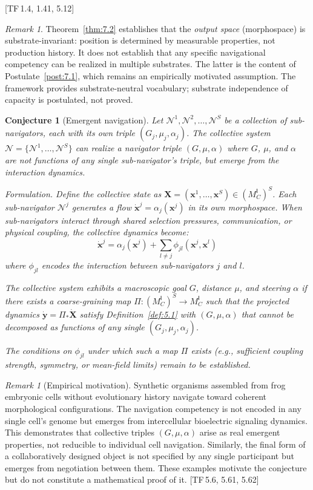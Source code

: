 \documentclass[10pt]{article}
\theoremstyle{definition}
\theoremstyle{plain}
\newtheorem{conjecture}[definition]{Conjecture}
\theoremstyle{remark}
\newtheorem{remark}[definition]{Remark}
\newcommand{\MC}{M^{\mathsf{I}}_C}          %
\newcommand{\Nav}{\mathcal{N}}               %
\newcommand{\TF}[1]{\textnormal{[TF\,#1]}}  %
\begin{document}
\TF{1.4, 1.41, 5.12}

\begin{remark}
Theorem~\ref{thm:7.2} establishes that the \emph{output space}
(morphospace) is substrate-invariant: position is determined by
measurable properties, not production history. It does not
establish that any specific navigational competency can be realized
in multiple substrates. The latter is the content of
Postulate~\ref{post:7.1}, which remains an empirically motivated
assumption. The framework provides substrate-neutral vocabulary;
substrate independence of capacity is postulated, not proved.
\end{remark}

\begin{conjecture}[Emergent navigation]\label{conj:7.3}
Let $\Nav^1, \Nav^2, \ldots, \Nav^S$ be a collection of sub-navigators,
each with its own triple $(G_j, \mu_j, \alpha_j)$. The collective system
$\Nav = \{\Nav^1, \ldots, \Nav^S\}$ can realize a navigator triple
$(G, \mu, \alpha)$ where $G$, $\mu$, and $\alpha$ are \emph{not}
functions of any single sub-navigator's triple, but emerge from the
interaction dynamics.

\medskip\noindent
\textit{Formulation.}\;
Define the collective state as $\bm{X} = (\bm{x}^1, \ldots, \bm{x}^S)
\in {(\MC)}^S$. Each sub-navigator $\Nav^j$ generates a flow
$\dot{\bm{x}}^j = \alpha_j(\bm{x}^j)$ in its own morphospace.
When sub-navigators interact through shared selection pressures,
communication, or physical coupling, the collective dynamics become:
\[
  \dot{\bm{x}}^j = \alpha_j(\bm{x}^j)
  + \sum_{l \neq j} \phi_{jl}(\bm{x}^j, \bm{x}^l)
\]
where $\phi_{jl}$ encodes the interaction between sub-navigators $j$
and $l$.

The collective system exhibits a macroscopic goal $G$, distance $\mu$,
and steering $\alpha$ if there exists a coarse-graining map
$\Pi : {(\MC)}^S \to \MC$ such that the projected dynamics
$\dot{\bm{y}} = \Pi_* \dot{\bm{X}}$ satisfy Definition~\ref{def:5.1}
with $(G, \mu, \alpha)$ that cannot be decomposed as functions of any
single $(G_j, \mu_j, \alpha_j)$.

The conditions on $\phi_{jl}$ under which such a map $\Pi$ exists
(e.g., sufficient coupling strength, symmetry, or mean-field limits)
remain to be established.
\end{conjecture}

\begin{remark}[Empirical motivation]\label{rem:xenobots}
Synthetic organisms assembled from frog embryonic cells
without evolutionary history navigate toward coherent morphological
configurations. The navigation competency is not encoded in any single
cell's genome but emerges from intercellular bioelectric signaling
dynamics. This demonstrates that collective triples $(G, \mu, \alpha)$
arise as real emergent properties, not reducible to individual cell
navigation. Similarly, the final form of a collaboratively designed
object is not specified by any single participant but emerges from
negotiation between them. These examples motivate the conjecture
but do not constitute a mathematical proof of it.
\TF{5.6, 5.61, 5.62}
\end{remark}
\end{document}
